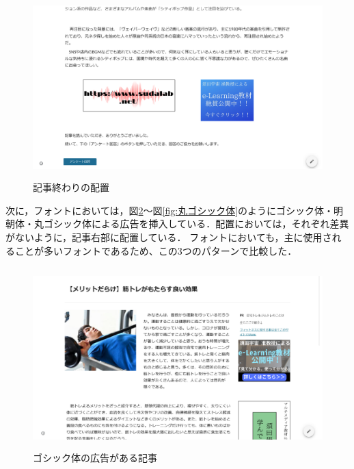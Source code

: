 \documentclass[12pt,a4j,titlepage]{ltjsarticle}
\begin{document}
\begin{figure}[H]
\begin{center}
 \includegraphics[height=70mm]{figures/記事終わり.pdf}
\end{center}
 \caption{記事終わりの配置}
 \label{fig:記事終わり}
\end{figure}

次に，フォントにおいては，図\ref{fig:ゴシック体}～図\ref{fig:丸ゴシック体}のようにゴシック体・明朝体・丸ゴシック体による広告を挿入している．配置においては，それぞれ差異がないように，記事右部に配置している．
フォントにおいても，主に使用されることが多いフォントであるため、この3つのパターンで比較した．

\begin{figure}[H]
\begin{center}
 \includegraphics[height=70mm]{figures/ゴシック体.pdf}
\end{center}
 \caption{ゴシック体の広告がある記事}
 \label{fig:ゴシック体}
\end{figure}
\end{document}
